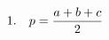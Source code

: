 \documentclass[preview]{standalone}
\begin{document}
\begin{align*}
\special{dvisvgm:raw <g id='unique000'>}1.\quad p = \dfrac{a+b+c}{2}\special{dvisvgm:raw </g>}
\end{align*}
\end{document}
